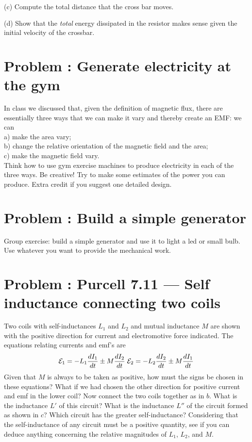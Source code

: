 \documentclass[problems]{esg8022pset}
\begin{document}
\par\noindent (c) Compute the total distance that the cross bar moves.

\par\noindent (d) Show that the {\it total} energy dissipated in the
resistor makes sense given the initial velocity of the crossbar.
\section{Problem \thesection: Generate electricity at the gym}
In class we discussed that, given the definition of magnetic flux, there are essentially three ways that we can make it vary and thereby create an EMF: we can \\
\noindent a) make the area vary;\\
\noindent b) change the relative orientation of the magnetic field and the area; \\
\noindent c) make the magnetic field vary. \\

\noindent Think how to use gym exercise machines to produce electricity in each of the three ways. Be creative!
Try to make some estimates of the power you can produce. Extra credit if you suggest one detailed design.
\section{Problem \thesection: Build a simple generator}
 Group exercise: build a simple generator and use it to light a led or small bulb. Use whatever you want to
  provide the mechanical work.
 
\section{Problem \thesection: Purcell 7.11 --- Self inductance connecting two coils}
Two coils with self-inductances $L_1$ and $L_2$ and mutual inductance $M$  are shown with the positive direction for current and electromotive force indicated. The equations relating currents and emf's are
\begin{equation}
{\cal E}_1 = -L_1\frac{dI_1}{dt}\pm M\frac{dI_2}{dt} \; {\cal E}_2 = -L_2\frac{dI_2}{dt}\pm M\frac{dI_1}{dt}
\end{equation}
Given that $M$ is always to be taken as positive, how must the signs be chosen in these equations? What if we had chosen the other direction for positive current and emf in the lower coil? Now connect the two coils together as in $b$. What is the inductance $L'$ of this circuit? What is the inductance $L''$ of the circuit formed as shown in $c$? Which circuit has the greater self-inductance? Considering that the self-inductance of any circuit must be a positive quantity, see if you can deduce anything concerning the relative magnitudes of $L_1$, $L_2$, and $M$.
\end{document}
